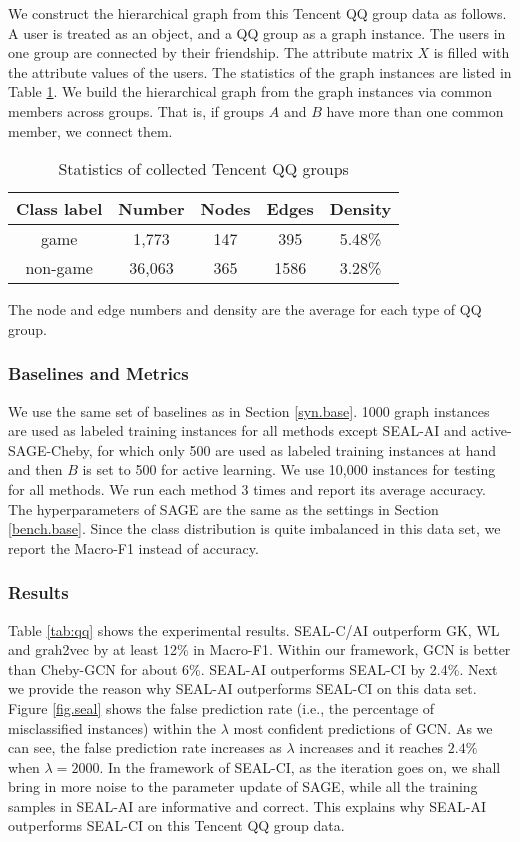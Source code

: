 \documentclass[sigconf]{acmart}
\newcommand{\eat}[1]{}
\begin{document}
We construct the hierarchical graph from this Tencent QQ group data as follows.  A user is treated as an object, and a QQ group as a graph instance.  The users in one group are connected by their friendship.  The attribute matrix $X$ is filled with the attribute values of the users.  The statistics of the graph instances are listed in Table \ref{tab:sqq}.  We build the hierarchical graph from the graph instances via common members across groups.  That is, if groups $A$ and $B$ have more than one common member, we connect them.

\begin{table}
  \caption{Statistics of collected Tencent QQ groups}
  \label{tab:sqq}
  \begin{tabular}{ccccc}
    \toprule
    \textbf{Class label}&\textbf{Number}&\textbf{Nodes}&\textbf{Edges}&\textbf{Density} \\
    \midrule
	game&1,773&147&395&5.48\%\\
	non-game&36,063&365&1586&3.28\%\\
  \bottomrule
\end{tabular}

\raggedright{The node and edge numbers and density are the average for each type of QQ group.}
\eat{\vspace{-0.3cm}}
\end{table}


\subsubsection{Baselines and Metrics}
We use the same set of baselines as in Section \ref{syn.base}.  1000 graph instances are used as labeled training instances for all methods except SEAL-AI and active-SAGE-Cheby, for which only 500 are used as labeled training instances at hand and then $B$ is set to 500 for active learning.  We use 10,000 instances for testing for all methods.  We run each method 3 times and report its average accuracy.  The hyperparameters of SAGE are the same as the settings in Section \ref{bench.base}. Since the class distribution is quite imbalanced in this data set, we report the Macro-F1 instead of accuracy.

\subsubsection{Results}

Table \ref{tab:qq} shows the experimental results.  SEAL-C/AI outperform GK, WL and grah2vec by at least 12\% in Macro-F1.  Within our framework, GCN is better than Cheby-GCN for about 6\%.  SEAL-AI outperforms SEAL-CI by 2.4\%.  Next we provide the reason why SEAL-AI outperforms SEAL-CI on this data set.  Figure \ref{fig.seal} shows the false prediction rate (i.e., the percentage of misclassified instances) within the $\lambda$ most confident predictions of GCN.  As we can see, the false prediction rate increases as $\lambda$ increases and it reaches $2.4\%$ when $\lambda=2000$. In the framework of SEAL-CI, as the iteration goes on, we shall bring in more noise to the parameter update of SAGE, while all the training samples in SEAL-AI are informative and correct. This explains why SEAL-AI outperforms SEAL-CI on this Tencent QQ group data.
\end{document}
